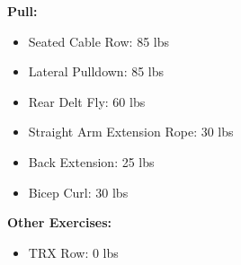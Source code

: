 \documentclass{article}
\begin{document}
\def\scr{85 }
\def\lp{85 }
\def\rdf{60 }
\def\saer{30 }
\def\be{25 }
\def\bc{30 }
\def\lr{10 }

\def\trxr{0 }

\textbf{Pull:}
\begin{itemize}
	\item Seated Cable Row: \hfill\scr lbs
	\item Lateral Pulldown: \hfill\lp lbs
	\item Rear Delt Fly: \hfill\rdf lbs
	\item Straight Arm Extension Rope: \hfill\saer lbs
	\item Back Extension: \hfill\be lbs
	\item Bicep Curl: \hfill\bc lbs
\end{itemize}\leavevmode\newline

\textbf{Other Exercises:}
\begin{itemize}
	\item TRX Row: \hfill\trxr lbs
\end{itemize}
\end{document}
